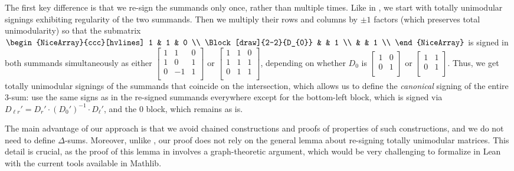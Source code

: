 The first key difference is that we re-sign the summands only once, rather than multiple times. Like in \cite{Truemper2016}, we start with totally unimodular signings exhibiting regularity of the two summands. Then we multiply their rows and columns by $\pm 1$ factors (which preserves total unimodularity) so that the submatrix $
\begin{NiceArray}{ccc}[hvlines]
    1 & 1 & 0 \\
    \Block[draw]{2-2}{D_{0}} & & 1 \\
    & & 1 \\
\end{NiceArray}
$ is signed in both summands simultaneously as either $
\begin{bmatrix}
    1 & 1 & 0 \\
    1 & 0 & 1 \\
    0 & -1 & 1 \\
\end{bmatrix}
$ or $
\begin{bmatrix}
    1 & 1 & 0 \\
    1 & 1 & 1 \\
    0 & 1 & 1 \\
\end{bmatrix}
$, depending on whether $D_{0}$ is $\begin{bmatrix} 1 & 0 \\ 0 & 1 \\ \end{bmatrix}$ or $\begin{bmatrix} 1 & 1 \\ 0 & 1 \\ \end{bmatrix}$. Thus, we get totally unimodular signings of the summands that coincide on the intersection, which allows us to define the \emph{canonical} signing of the entire 3-sum: use the same signs as in the re-signed summands everywhere except for the bottom-left block, which is signed via $D_{\ell r}' = D_{r}' \cdot (D_{0}')^{-1} \cdot D_{\ell}'$, and the $0$ block, which remains as is.

The main advantage of our approach is that we avoid chained constructions and proofs of properties of such constructions, and we do not need to define $\Delta$-sums. Moreover, unlike \cite{Truemper2016}, our proof does not rely on the general lemma about re-signing totally unimodular matrices. This detail is crucial, as the proof of this lemma in \cite{Truemper2016} involves a graph-theoretic argument, which would be very challenging to formalize in Lean with the current tools available in Mathlib.

